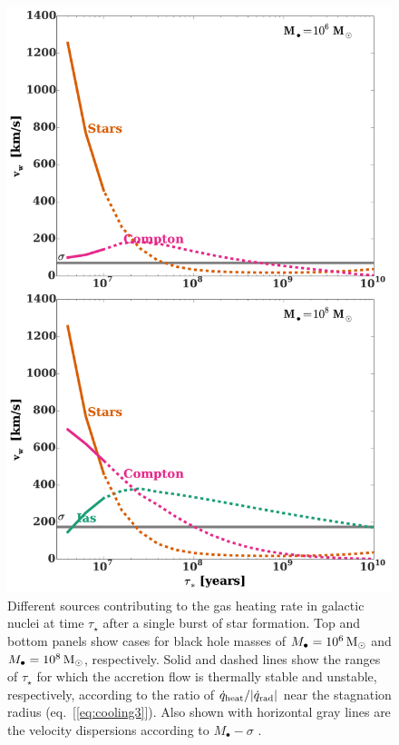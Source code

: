 \documentclass[usenatbib,fleqn]{mn2e}
\newcommand{\Mbh}[1][]{M_{\bullet#1}}
\begin{document}
\begin{figure}
\includegraphics[width=\columnwidth]{vwSourcesImp.pdf}
\caption{\label{fig:vwSourcesImp} Different sources contributing to the gas heating rate in galactic nuclei at time $\tau_{\star}$ after a single burst of star formation.  Top and bottom panels show cases for black hole masses of $\Mbh=10^6 \Msun$ and $\Mbh= 10^8 \Msun$, respectively.  Solid and dashed lines show the ranges of $\tau_{\star}$ for which the accretion flow is thermally stable and unstable, respectively, according to the ratio of $\dot{q}_{\rm heat}/|\dot{q}_{\rm rad}|$ near the stagnation radius (eq.~[\ref{eq:cooling3}]).   Also shown with horizontal gray lines are the velocity dispersions according to $\Mbh-\sigma$ \citep{Gultekin+09}.}
\end{figure}
\end{document}
